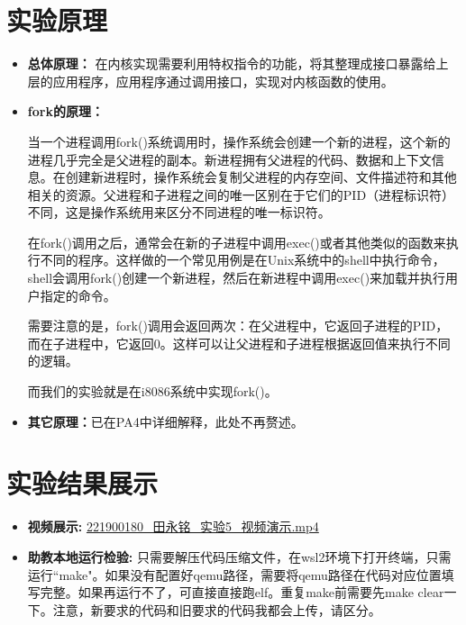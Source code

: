 \documentclass{LabReport}
\begin{document}
	\section{实验原理}
	\begin{itemize}
		\item \textbf{总体原理：} 在内核实现需要利用特权指令的功能，将其整理成接口暴露给上层的应用程序，应用程序通过调用接口，实现对内核函数的使用。
		
		\item \textbf{fork的原理：} \par\hspace{2em}当一个进程调用fork()系统调用时，操作系统会创建一个新的进程，这个新的进程几乎完全是父进程的副本。新进程拥有父进程的代码、数据和上下文信息。在创建新进程时，操作系统会复制父进程的内存空间、文件描述符和其他相关的资源。父进程和子进程之间的唯一区别在于它们的PID（进程标识符）不同，这是操作系统用来区分不同进程的唯一标识符。\par\hspace{2em}
		在fork()调用之后，通常会在新的子进程中调用exec()或者其他类似的函数来执行不同的程序。这样做的一个常见用例是在Unix系统中的shell中执行命令，shell会调用fork()创建一个新进程，然后在新进程中调用exec()来加载并执行用户指定的命令。\par\hspace{2em}
		需要注意的是，fork()调用会返回两次：在父进程中，它返回子进程的PID，而在子进程中，它返回0。这样可以让父进程和子进程根据返回值来执行不同的逻辑。\par\hspace{2em}
		而我们的实验就是在i8086系统中实现fork()。
		
		\item \textbf{其它原理：}已在PA4中详细解释，此处不再赘述。
		
	\end{itemize}
	
	\section{实验结果展示}
	\begin{itemize}
		\label{result_video}
		
		\item \textbf{视频展示: } \href{https://box.nju.edu.cn/f/ae5c554c586b481ea788/}{\color{red} 221900180\_田永铭\_实验5\_视频演示.mp4}
		\item \textbf{助教本地运行检验: } 只需要解压代码压缩文件，在wsl2环境下打开终端，只需运行``make"。如果没有配置好qemu路径，需要将qemu路径在代码对应位置填写完整。如果再运行不了，可直接直接跑elf。重复make前需要先make clear一下。注意，新要求的代码和旧要求的代码我都会上传，请区分。
	\end{itemize}
\end{document}
